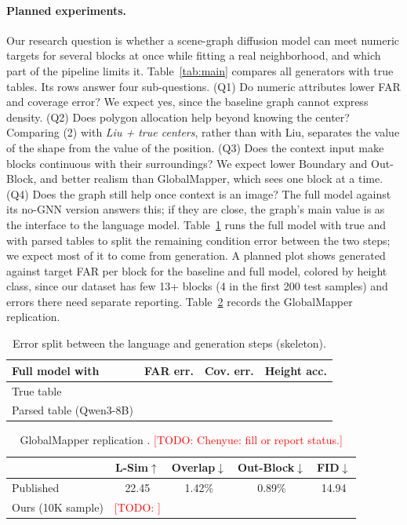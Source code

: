 \documentclass[twocolumn,11pt]{article}
\newcommand{\todo}[1]{\textcolor{red}{[TODO: #1]}}
\begin{document}
\paragraph{Planned experiments.} Our research question is whether a scene-graph diffusion model can meet numeric targets for several blocks at once while fitting a real neighborhood, and which part of the pipeline limits it. Table~\ref{tab:main} compares all generators with true tables. Its rows answer four sub-questions. (Q1) Do numeric attributes lower FAR and coverage error? We expect yes, since the baseline graph cannot express density. (Q2) Does polygon allocation help beyond knowing the center? Comparing (2) with \emph{Liu + true centers}, rather than with Liu, separates the value of the shape from the value of the position. (Q3) Does the context input make blocks continuous with their surroundings? We expect lower Boundary and Out-Block, and better realism than GlobalMapper, which sees one block at a time. (Q4) Does the graph still help once context is an image? The full model against its no-GNN version answers this; if they are close, the graph's main value is as the interface to the language model. Table~\ref{tab:llm} runs the full model with true and with parsed tables to split the remaining condition error between the two steps; we expect most of it to come from generation. A planned plot shows generated against target FAR per block for the baseline and full model, colored by height class, since our dataset has few 13+ blocks (4 in the first 200 test samples) and errors there need separate reporting. Table~\ref{tab:gm} records the GlobalMapper replication.

\begin{table}[t]
\centering\small
\begin{tabular}{lccc}
\toprule
Full model with & FAR err. & Cov. err. & Height acc. \\
\midrule
True table & & & \\
Parsed table (Qwen3-8B) & & & \\
\bottomrule
\end{tabular}
\caption{Error split between the language and generation steps (skeleton).}
\label{tab:llm}
\end{table}

\begin{table}[t]
\centering\small
\begin{tabular}{lcccc}
\toprule
& L-Sim$\uparrow$ & Overlap$\downarrow$ & Out-Block$\downarrow$ & FID$\downarrow$ \\
\midrule
Published & 22.45 & 1.42\% & 0.89\% & 14.94 \\
Ours (10K sample) & \todo{} & & & \\
\bottomrule
\end{tabular}
\caption{GlobalMapper replication \citep{he2023globalmapper}. \todo{Chenyue: fill or report status.}}
\label{tab:gm}
\end{table}
\end{document}
